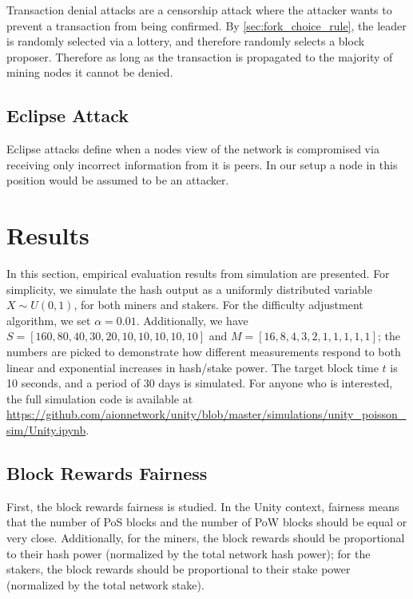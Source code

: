 \documentclass[a4paper]{article}
\begin{document}
Transaction denial attacks are a censorship attack where the attacker wants to prevent a transaction from being confirmed. By \cref{sec:fork_choice_rule}, the leader is randomly selected via a lottery, and therefore randomly selects a block proposer. Therefore as long as the transaction is propagated to the majority of mining nodes it cannot be denied.

\subsection{Eclipse Attack}

Eclipse attacks define when a nodes view of the network is compromised via receiving only incorrect information from it is peers. In our setup a node in this position would be assumed to be an attacker.

\section{Results}

In this section, empirical evaluation results from simulation are presented. For simplicity, we simulate the hash output as a uniformly distributed variable $X \sim U(0, 1)$, for both miners and stakers. For the difficulty adjustment algorithm, we set $\alpha = 0.01$. Additionally, we have $S = [160, 80, 40, 30, 20, 10, 10, 10, 10, 10]$ and $M = [16, 8, 4, 3, 2, 1, 1, 1, 1, 1]$; the numbers are picked to demonstrate how different measurements respond to both linear and exponential increases in hash/stake power. The target block time $t$ is 10 seconds, and a period of 30 days is simulated. For anyone who is interested, the full simulation code is available at \url{https://github.com/aionnetwork/unity/blob/master/simulations/unity_poisson_sim/Unity.ipynb}.

\subsection{Block Rewards Fairness}

First, the block rewards fairness is studied. In the Unity context, fairness means that the number of PoS blocks and the number of PoW blocks should be equal or very close. Additionally, for the miners, the block rewards should be proportional to their hash power (normalized by the total network hash power); for the stakers, the block rewards should be proportional to their stake power (normalized by the total network stake).
\end{document}
